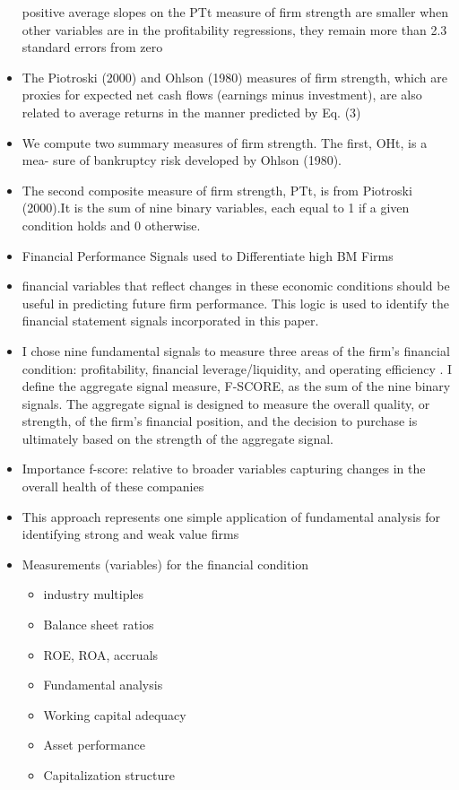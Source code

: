 \documentclass[12pt]{article}
\begin{document}
\begin{itemize}
        positive average slopes on the PTt measure of firm strength are smaller when other variables are in the profitability regressions, they remain more than 2.3 standard errors
        from zero \citet{Fama2006}
        \item The Piotroski (2000) and Ohlson (1980) measures of firm strength, which are proxies for expected net cash flows (earnings minus investment), are also related to average returns in the manner predicted by Eq. (3) \citet{Fama2006}
        \item We compute two summary measures of firm strength. The first, OHt, is a mea- sure of bankruptcy risk developed by Ohlson (1980).\citet{Fama2006}
        \item The second composite measure of firm strength, PTt, is from Piotroski (2000).It
        is the sum of nine binary variables, each equal to 1 if a given condition holds and 0 otherwise.\citet{Fama2006}

        \item Financial Performance Signals used to Differentiate high BM Firms \citet{Piotroski2000}
        \item financial variables that reflect changes in these economic conditions should be useful in predicting future firm performance. This logic is used to identify the financial statement signals incorporated in this paper. \citet{Piotroski2000}
        \item I chose nine fundamental signals to measure three areas of the firm's financial condition: profitability, financial leverage/liquidity, and operating efficiency \citet{Piotroski2000}. I define the aggregate signal measure, F-SCORE, as the sum of the nine binary signals. The aggregate signal is designed to measure the overall quality, or strength, of the firm's financial position, and the decision to purchase is ultimately based on the strength of the aggregate signal.
        \item Importance f-score: relative to broader variables capturing changes in the overall health of these companies \cite{Piotroski2000}
        \item This approach represents one simple application of fundamental analysis for identifying strong and weak value firms \citet{Piotroski2000}
        
        \item Measurements (variables) for the financial condition 
    
            \begin{itemize}
            \item industry multiples
            \item Balance sheet ratios
            \item ROE, ROA, accruals 
            \item Fundamental analysis
            \item Working capital adequacy
            \item Asset performance
            \item Capitalization structure
            \end{itemize}
    

\end{itemize}
\end{document}
